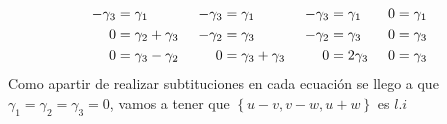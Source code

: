\begin{enumerate}[label=\listAlph]
\[\begin{aligned}
                    -\gamma_3 &= \gamma_1 \\
                    0 &= \gamma_2 + \gamma_3 \\
                    0 &= \gamma_3 - \gamma_2 \\
                \end{aligned}
                \hspace{0.5cm}
                \begin{aligned}
                    -\gamma_3 &= \gamma_1 \\
                    -\gamma_2 &= \gamma_3 \\
                    0 &= \gamma_3 + \gamma_3 \\
                \end{aligned}
                \hspace{0.5cm}
                \begin{aligned}
                    -\gamma_3 &= \gamma_1 \\
                    -\gamma_2 &= \gamma_3 \\
                    0 &= 2\gamma_3 \\
                \end{aligned}
                \hspace{0.5cm}
                \begin{aligned}
                    0 &= \gamma_1 \\
                    0 &= \gamma_3 \\
                    0 &= \gamma_3 \\
                \end{aligned}
            \]
            Como apartir de realizar subtituciones en cada ecuación se llego a que \(\gamma_1 = \gamma_2 = \gamma_3 = 0\), 
            vamos a tener que \(\left\{u - v, v - w, u + w\right\}\) es \(l.i\)
    \end{enumerate}

